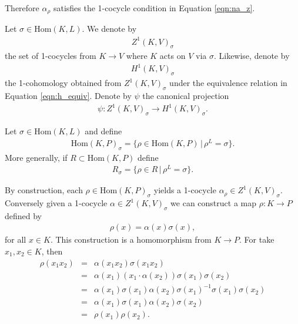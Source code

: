 Therefore $\alpha_\rho$ satisfies the 1-cocycle condition in Equation \ref{eqn:na_z}.

\begin{definition} Let $\sigma \in \mathrm{Hom}(K, L)$. We denote by
\begin{eqnarray*} Z^1(K, V)_\sigma \end{eqnarray*}
the set of 1-cocycles from $K \rightarrow V$ where $K$ acts on $V$ via $\sigma$.
Likewise, denote by
\begin{eqnarray*} H^1(K, V)_\sigma \end{eqnarray*}
the 1-cohomology obtained from $Z^1(K, V)_\sigma$ under the equivalence relation in Equation \ref{eqn:h_equiv}. Denote by $\psi$ the canonical projection
\begin{eqnarray*} \psi : Z^1(K, V)_\sigma \rightarrow H^1(K, V)_\sigma. \end{eqnarray*}
\end{definition} 

\begin{definition} Let $\sigma \in \mathrm{Hom}(K, L)$ and define
\begin{eqnarray*} \mathrm{Hom}(K, P)_\sigma = \{ \rho \in \mathrm{Hom}(K, P) \,|\, \rho^L = \sigma\}. \end{eqnarray*}
More generally, if $R \subset \mathrm{Hom}(K, P)$ define
\begin{eqnarray*} R_\sigma = \{ \rho \in R \,|\, \rho^L = \sigma \}. \end{eqnarray*}
\end{definition}

By construction, each $\rho \in \mathrm{Hom}(K, P)_\sigma$ yields a 1-cocycle $\alpha_\rho \in Z^1(K, V)_\sigma$.
Conversely given a 1-cocycle $\alpha \in Z^1(K, V)_\sigma$ we can construct a map $\rho: K \rightarrow P$ defined by
\begin{eqnarray*}
\rho(x) = \alpha(x)\sigma(x),
\end{eqnarray*}
for all $x \in K$. This construction is a homomorphism from $K \rightarrow P$. For take $x_1, x_2 \in K$, then
\begin{eqnarray*}
  \rho(x_1 x_2) &=& \alpha(x_1 x_2) \sigma(x_1 x_2) \\
  &=& \alpha(x_1)(x_1 \cdot \alpha(x_2)) \sigma(x_1) \sigma(x_2) \\
  &=& \alpha(x_1) \sigma(x_1) \alpha(x_2) \sigma(x_1)^{-1} \sigma(x_1) \sigma(x_2) \\
  &=& \alpha(x_1) \sigma(x_1) \alpha(x_2) \sigma(x_2) \\
  &=& \rho(x_1) \rho(x_2).
\end{eqnarray*}

